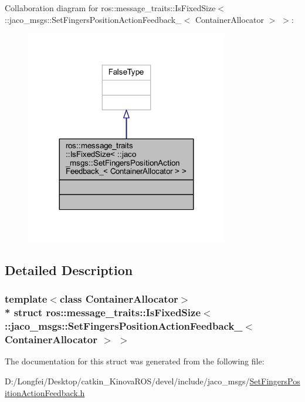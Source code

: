 Collaboration diagram for ros\+:\+:message\+\_\+traits\+:\+:Is\+Fixed\+Size$<$ \+:\+:jaco\+\_\+msgs\+:\+:Set\+Fingers\+Position\+Action\+Feedback\+\_\+$<$ Container\+Allocator $>$ $>$\+:
\nopagebreak
\begin{figure}[H]
\begin{center}
\leavevmode
\includegraphics[width=251pt]{da/d82/structros_1_1message__traits_1_1IsFixedSize_3_01_1_1jaco__msgs_1_1SetFingersPositionActionFeedbafdeed29d3a3662a9ece5536b205eb813}
\end{center}
\end{figure}


\subsection{Detailed Description}
\subsubsection*{template$<$class Container\+Allocator$>$\\*
struct ros\+::message\+\_\+traits\+::\+Is\+Fixed\+Size$<$ \+::jaco\+\_\+msgs\+::\+Set\+Fingers\+Position\+Action\+Feedback\+\_\+$<$ Container\+Allocator $>$ $>$}



The documentation for this struct was generated from the following file\+:\begin{DoxyCompactItemize}
\item 
D\+:/\+Longfei/\+Desktop/catkin\+\_\+\+Kinova\+R\+O\+S/devel/include/jaco\+\_\+msgs/\hyperlink{SetFingersPositionActionFeedback_8h}{Set\+Fingers\+Position\+Action\+Feedback.\+h}\end{DoxyCompactItemize}
